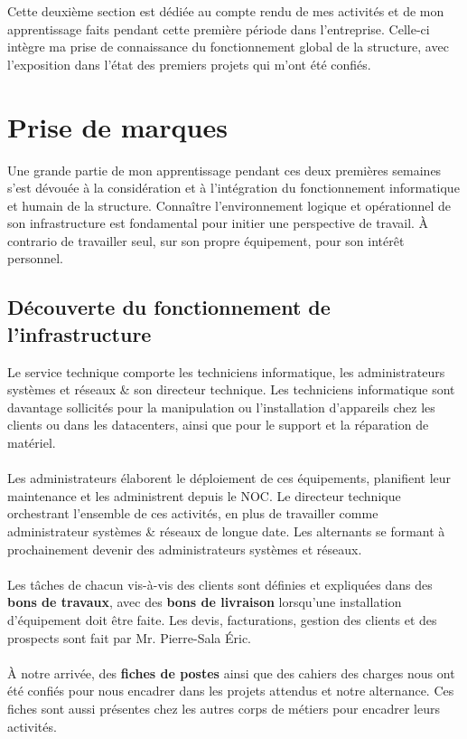 
Cette deuxième section est dédiée au compte rendu de mes activités et de mon apprentissage faits pendant cette première période dans l'entreprise. Celle-ci intègre ma prise de connaissance du fonctionnement global de la structure, avec l'exposition dans l'état des premiers projets qui m'ont été confiés.  

\section{Prise de marques}

Une grande partie de mon apprentissage pendant ces deux premières semaines s'est dévouée à la considération et à l'intégration du fonctionnement informatique et humain de la structure. Connaître l'environnement logique et opérationnel de son infrastructure est fondamental pour initier une perspective de travail. À contrario de travailler seul, sur son propre équipement, pour son intérêt personnel.


\subsection{Découverte du fonctionnement de l'infrastructure}

Le service technique comporte les techniciens informatique, les administrateurs systèmes et réseaux \& son directeur technique. Les techniciens informatique sont davantage sollicités pour la manipulation ou l'installation d'appareils chez les clients ou dans les datacenters, ainsi que pour le support et la réparation de matériel.
\\ \\
Les administrateurs élaborent le déploiement de ces équipements, planifient leur maintenance et les administrent depuis le NOC. Le directeur technique orchestrant l'ensemble de ces activités, en plus de travailler comme administrateur systèmes \& réseaux de longue date. Les alternants se formant à prochainement devenir des administrateurs systèmes et réseaux.
\\ \\
Les tâches de chacun vis-à-vis des clients sont définies et expliquées dans des \textbf{bons de travaux}, avec des \textbf{bons de livraison} lorsqu'une installation d'équipement doit être faite. Les devis, facturations, gestion des clients et des prospects sont fait par Mr. Pierre-Sala Éric.
\\ \\
À notre arrivée, des \textbf{fiches de postes} ainsi que des cahiers des charges nous ont été confiés pour nous encadrer dans les projets attendus et notre alternance. Ces fiches sont aussi présentes chez les autres corps de métiers pour encadrer leurs activités.

